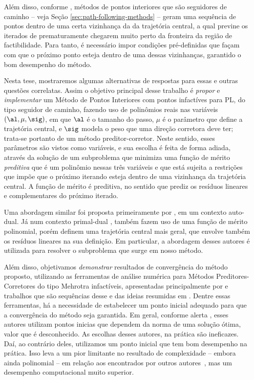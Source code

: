 Além disso, conforme \textcite{Hung:1996br}, métodos de pontos interiores que são seguidores de caminho  -- veja Seção \ref{sec:path-following-methods} --  geram uma sequência de pontos dentro de uma certa vizinhança da da trajetória central, a qual previne os iterados de prematuramente chegarem muito perto da fronteira da região de factibilidade. Para tanto, é necessário impor condições pré-definidas que façam com que o próximo ponto esteja dentro de uma dessas vizinhanças, garantido  o bom desempenho do método. 




Nesta tese, mostraremos algumas alternativas de respostas para  essas e outras questões correlatas. Assim o objetivo principal desse trabalho é \emph{propor} e \emph{implementar} um Método de Pontos Interiores com pontos infactíves para \ac{PL}, do tipo seguidor de caminho, fazendo  uso de polinômios reais nas variáveis $(\al,\mu,\sig)$, em que $\al$ é o tamanho do passo, $\mu$ é o parâmetro que define a trajetória central, e $\sig$ modela o peso que uma direção corretora deve ter; trata-se portanto de um método preditor-corretor. Neste sentido, esses parâmetros são vistos como variáveis, e sua escolha é feita de forma adiada, através da solução de um subproblema que minimiza uma função de mérito \emph{preditiva} que é um polinômio nessas três variáveis e que está sujeita a restrições que impõe que o próximo iterando esteja dentro de uma vizinhança da trajetória central. A função de mérito é preditiva, no sentido que prediz os resíduos lineares e complementares do próximo iterado.


Uma abordagem similar foi proposta primeiramente por \textcite{VillasBoas:2003tg}, em um contexto auto-dual. Já num contexto primal-dual \textcite{VillasBoas:2012ur,VillasBoas2013:wn}, também fazem uso de uma função de mérito polinomial, porém definem uma trajetória central mais geral, que envolve também os resíduos lineares na sua definição.  Em particular, a abordagem desses autores é utilizada para resolver o subproblema que surge em nosso método.

Além disso, objetivamos \emph{demonstrar} resultados de convergência do método proposto, utilizando as ferramentas de análise numérica para Métodos Preditores-Corretores do tipo Mehrotra infactíveis, apresentadas principalmente por \textcite{Zhang:2006ic} e trabalhos que são sequências desse e das ideias resumidas em \textcite[cap. 7]{Wright:Primal-dual-interior-point:1997h}. Dentre essas ferramentas, há a necessidade de estabelecer um ponto inicial adequado para que a convergência do método seja garantida. Em geral, conforme alerta \textcite[p. 112]{Wright:Primal-dual-interior-point:1997h}, esses autores utilizam pontos inicias que dependem da norma de uma solução ótima, valor que é desconhecido. As escolhas desses autores, na prática são ineficazes. 
Daí, ao contrário deles, utilizamos um ponto inicial que tem bom desempenho na prática. Isso leva a um pior limitante no resultado de complexidade -- embora ainda polinomial -- em relação aos encontrados por outros autores~\cite{Zhang:1995fu,Zhang:2006ic,Wright:1993je,Wright:1996kj}, mas um desempenho computacional muito superior. 


